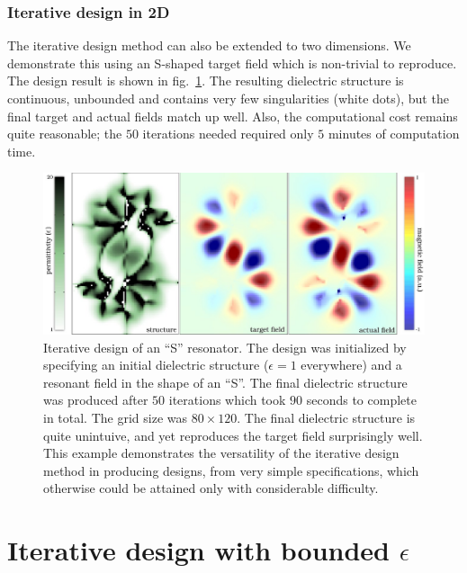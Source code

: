 \subsection{Iterative design in 2D}
The iterative design method can also be extended to two dimensions\cite{Lu10}.
We demonstrate this using an S-shaped target field 
    which is non-trivial to reproduce. 
The design result is shown in fig.~\ref{S pic}. 
    The resulting dielectric structure is continuous, unbounded and 
    contains very few singularities (white dots), 
    but the final target and actual fields match up well. 
Also, the computational cost remains quite reasonable; the $50$ iterations needed required only $5$ minutes of computation time. 
\begin{figure}\centering
\includegraphics[width=\textwidth]{p1/S}
\caption{Iterative design of an ``S'' resonator. 
The design was initialized by specifying an initial dielectric structure ($\epsilon=1$ everywhere) and a resonant field in the shape of an ``S''. 
The final dielectric structure was produced after $50$ iterations which took $90$ seconds to complete in total. The grid size was $80\times 120$. The final dielectric structure is quite unintuive, and yet reproduces the target field surprisingly well. This example demonstrates the versatility of the iterative design method in producing designs, from very simple specifications, which otherwise could be attained only with considerable difficulty.}
\label{S pic}
\end{figure}

\chapter{Iterative design with bounded $\epsilon$} \label{bounded}
